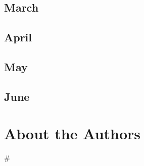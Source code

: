 \documentclass[12pt,letterpaper,oneside]{memoir}
\newcommand\secdiv{
  \begin{center}
    \#
  \end{center}
}
\begin{document}
  \chapter{March}
  
  
  
  
  
  \chapter{April}
  
  
  
  \chapter{May}
  
  
  
  
  
  
  \chapter{June}
  
  
  
  
  
  
  
  
  
  
  

  \part{About the Authors}
  

  \newpage
  \secdiv
\end{document}
